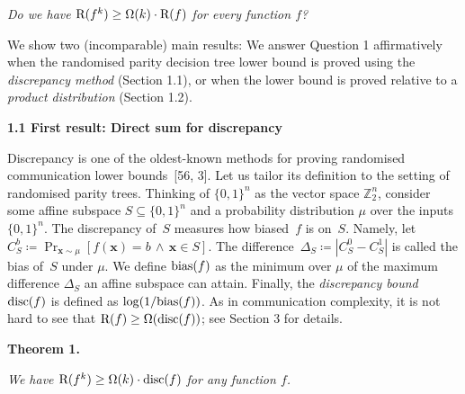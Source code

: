 \documentclass[10pt,a4paper]{article}
\begin{document}
\emph{Do we have ${\textup{R}}(f^{k})\geq\Omega(k)\cdot{\textup{R}}(f)$ for every function $f$?}\par






We show two (incomparable) main results: We answer Question 1 affirmatively when the randomised parity decision tree lower bound is proved using the \emph{discrepancy method} (Section 1.1), or when the lower bound is proved relative to a \emph{product distribution} (Section 1.2).\par





\par\medskip\noindent\textbf{
1.1 First result: Direct sum for discrepancy}\par




Discrepancy is one of the oldest-known methods for proving randomised communication lower bounds [56, 3]. Let us tailor its definition to the setting of randomised parity trees. Thinking of $\{0,1\}^{n}$ as the vector space $\mathbb{Z}_{2}^{n}$, consider some affine subspace $S\subseteq\{0,1\}^{n}$ and a probability distribution $\mu$ over the inputs $\{0,1\}^{n}$. The discrepancy of $S$ measures how biased $f$ is on $S$. Namely, let $C^{b}_{S}\coloneqq\Pr_{\bm{x}\sim\mu}[f(\bm{x})=b\,\wedge\,\bm{x}\in S]$. The difference $\Delta_{S}\coloneqq|C^{0}_{S}-C^{1}_{S}|$ is called the bias of $S$ under $\mu$. We define ${\textup{bias}}(f)$ as the minimum over $\mu$ of the maximum difference $\Delta_{S}$ an affine subspace can attain. Finally, the \emph{discrepancy bound} ${\textup{disc}}(f)$ is defined as $\log(1/{\textup{bias}}(f))$. As in communication complexity, it is not hard to see that ${\textup{R}}(f)\geq\Omega({\textup{disc}}(f))$; see Section 3 for details.\par






\par\medskip\noindent\textbf{
\textbf{Theorem 1}\textbf{.}
}\par



\emph{We have ${\textup{R}}(f^{k})\geq\Omega(k)\cdot{\textup{disc}}(f)$ for any function $f$.}\par
\end{document}
